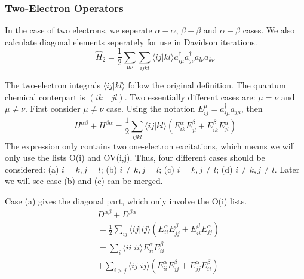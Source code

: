 \documentclass[twocolumn]{article}
\begin{document}
\subsubsection{Two-Electron Operators}
In the case of two electrons, we seperate $\alpha-\alpha$, $\beta-\beta$ and $\alpha-\beta$ cases.
We also calculate diagonal elements seperately for use in Davidson iterations.
\begin{equation}
  \hat{H}_2=\frac{1}{2}\sum_{\mu\nu}\sum_{ijkl}\langle ij|kl\rangle a_{i\mu}^{\dagger}a_{j\nu}^{\dagger}a_{l\nu}a_{k\nu}
  \label{eq:H2}
\end{equation}

The two-electron integrals $\langle ij|kl\rangle$ follow the original definition. The quantum chemical conterpart is $(ik\|jl)$. Two essentially different cases are: $\mu=\nu$ and $\mu\neq\nu$. First consider $\mu\neq\nu$ case. Using the notation $E_{ij}^{\mu}=a_{i\mu}^{\dagger}a_{j\mu}$, then
\begin{equation}
    H^{\alpha\beta}+H^{\beta\alpha}=\frac{1}{2}\sum_{ijkl}\langle ij|kl\rangle (E_{ik}^{\alpha}E_{jl}^{\beta}+E_{ik}^{\beta}E_{jl}^{\alpha})
    \label{eq:H2AB}
\end{equation}
The expression only contains two one-electron excitations, which means we will only use the lists O(i) and OV(i,j). Thus, four different cases should be considered:
(a) $i=k,j=l$; (b) $i\neq k,j=l$; (c) $i=k,j\neq l$; (d) $i\neq k,j\neq l$. Later we will see case (b) and (c) can be merged.

Case (a) gives the diagonal part, which only involve the O(i) lists.
\begin{equation}
  \begin{split}
    &D^{\alpha\beta}+D^{\beta\alpha}\\
    &=\frac{1}{2}\sum_{ij}\langle ij|ij\rangle (E_{ii}^{\alpha}E_{jj}^{\beta}+E_{ii}^{\beta}E_{jj}^{\alpha})\\
    &=\sum_{i}\langle ii|ii\rangle E_{ii}^{\alpha}E_{ii}^{\beta}\\
    &+\sum_{i>j}\langle ij|ij\rangle (E_{ii}^{\alpha}E_{jj}^{\beta}+E_{jj}^{\alpha}E_{ii}^{\beta})
  \end{split}
  \label{eq:H2ABD}
\end{equation}
\end{document}
